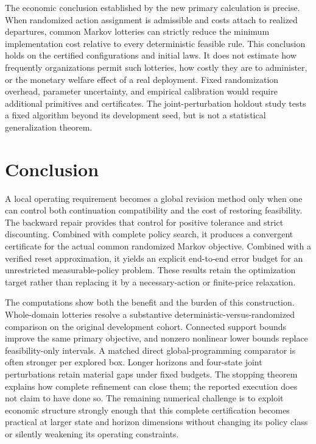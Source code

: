 The economic conclusion established by the new primary calculation is precise. When randomized action assignment is admissible and costs attach to realized departures, common Markov lotteries can strictly reduce the minimum implementation cost relative to every deterministic feasible rule. This conclusion holds on the certified configurations and initial laws. It does not estimate how frequently organizations permit such lotteries, how costly they are to administer, or the monetary welfare effect of a real deployment. Fixed randomization overhead, parameter uncertainty, and empirical calibration would require additional primitives and certificates. The joint-perturbation holdout study tests a fixed algorithm beyond its development seed, but is not a statistical generalization theorem.

\section{Conclusion}\label{sec:conclusion}
A local operating requirement becomes a global revision method only when one can control both continuation compatibility and the cost of restoring feasibility. The backward repair provides that control for positive tolerance and strict discounting. Combined with complete policy search, it produces a convergent certificate for the actual common randomized Markov objective. Combined with a verified reset approximation, it yields an explicit end-to-end error budget for an unrestricted measurable-policy problem. These results retain the optimization target rather than replacing it by a necessary-action or finite-price relaxation.

The computations show both the benefit and the burden of this construction. Whole-domain lotteries resolve a substantive deterministic-versus-randomized comparison on the original development cohort. Connected support bounds improve the same primary objective, and nonzero nonlinear lower bounds replace feasibility-only intervals. A matched direct global-programming comparator is often stronger per explored box. Longer horizons and four-state joint perturbations retain material gaps under fixed budgets. The stopping theorem explains how complete refinement can close them; the reported execution does not claim to have done so. The remaining numerical challenge is to exploit economic structure strongly enough that this complete certification becomes practical at larger state and horizon dimensions without changing its policy class or silently weakening its operating constraints.



